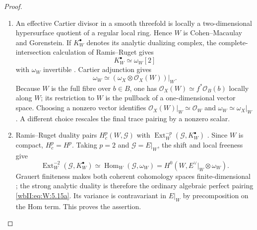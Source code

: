\begin{proof}

\begin{enumerate}[label={$\langle1\rangle$\arabic*.},leftmargin=*]
\item An effective Cartier divisor in a smooth threefold is locally a
two-dimensional hypersurface quotient of a regular local ring.  Hence $W$
is Cohen--Macaulay and Gorenstein.  If $K_W^\bullet$ denotes its analytic
dualizing complex, the complete-intersection calculation of Ramis--Ruget
gives
\[
 K_W^\bullet\simeq\omega_W[2]
\]
with $\omega_W$ invertible
\cite[Proposition~2 and the complete-intersection calculation,
pp.~90--91]{RR70push}.  Cartier adjunction gives
\[
 \omega_W\simeq
 (\omega_X\otimes\mathcal O_X(W))|_W.
\]
Because $W$ is the full fibre over $b\in B$, one has
$\mathcal O_X(W)\simeq f^*\mathcal O_B(b)$ locally along $W$; its
restriction to $W$ is the pullback of a one-dimensional vector space.
Choosing a nonzero vector identifies
$\mathcal O_X(W)|_W\simeq\mathcal O_W$ and
$\omega_W\simeq\omega_X|_W$.  A different choice rescales the final trace
pairing by a nonzero scalar.

\item Ramis--Ruget duality pairs $H_c^p(W,\mathcal G)$ with
$\operatorname{Ext}^{-p}_W(\mathcal G,K_W^\bullet)$
\cite[Theorem~2, pp.~82--83]{RR70push}.  Since $W$ is compact,
$H_c^p=H^p$.  Taking $p=2$ and $\mathcal G=E|_W$, the shift and local
freeness give
\[
 \operatorname{Ext}^{-2}_W(\mathcal G,K_W^\bullet)
 \simeq\operatorname{Hom}_W(\mathcal G,\omega_W)
 =H^0(W,E^\vee|_W\otimes\omega_W).
\]
Grauert finiteness makes both coherent cohomology spaces finite-dimensional
\cite{Grauert1960D}; the strong analytic duality is therefore the ordinary
algebraic perfect pairing \eqref{wbII:eq:W:5.15a}.  Its variance is contravariant in $E|_W$
by precomposition on the Hom term.  This proves the assertion.

\end{enumerate}
\end{proof}
